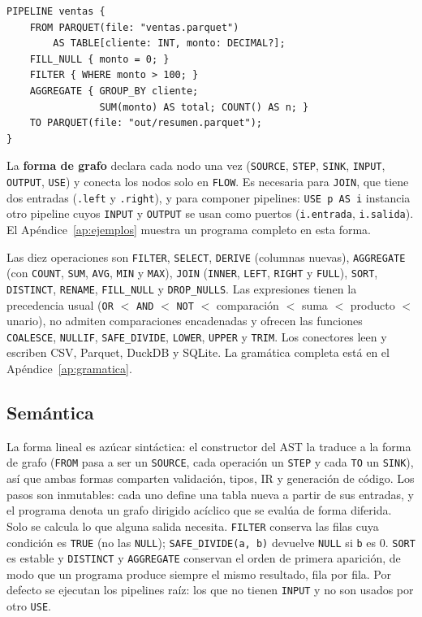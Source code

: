 \documentclass[sigplan,screen,nonacm]{acmart}
\begin{document}
\begin{lstlisting}[language=etl]
PIPELINE ventas {
    FROM PARQUET(file: "ventas.parquet")
        AS TABLE[cliente: INT, monto: DECIMAL?];
    FILL_NULL { monto = 0; }
    FILTER { WHERE monto > 100; }
    AGGREGATE { GROUP_BY cliente;
                SUM(monto) AS total; COUNT() AS n; }
    TO PARQUET(file: "out/resumen.parquet");
}
\end{lstlisting}

La \textbf{forma de grafo} declara cada nodo una vez (\texttt{SOURCE}, \texttt{STEP},
\texttt{SINK}, \texttt{INPUT}, \texttt{OUTPUT}, \texttt{USE}) y conecta los nodos solo en
\texttt{FLOW}. Es necesaria para \texttt{JOIN}, que tiene dos entradas (\texttt{.left} y
\texttt{.right}), y para componer pipelines: \texttt{USE p AS i} instancia otro pipeline cuyos
\texttt{INPUT} y \texttt{OUTPUT} se usan como puertos (\texttt{i.entrada}, \texttt{i.salida}).
El Apéndice~\ref{ap:ejemplos} muestra un programa completo en esta forma.

Las diez operaciones son \texttt{FILTER}, \texttt{SELECT}, \texttt{DERIVE} (columnas
nuevas), \texttt{AGGREGATE} (con \texttt{COUNT}, \texttt{SUM}, \texttt{AVG}, \texttt{MIN} y
\texttt{MAX}), \texttt{JOIN} (\texttt{INNER}, \texttt{LEFT}, \texttt{RIGHT} y \texttt{FULL}),
\texttt{SORT}, \texttt{DISTINCT}, \texttt{RENAME}, \texttt{FILL\_NULL} y \texttt{DROP\_NULLS}.
Las expresiones tienen la precedencia usual
(\texttt{OR} $<$ \texttt{AND} $<$ \texttt{NOT} $<$ comparación $<$ suma $<$ producto $<$
unario), no admiten comparaciones encadenadas y ofrecen las funciones \texttt{COALESCE},
\texttt{NULLIF}, \texttt{SAFE\_DIVIDE}, \texttt{LOWER}, \texttt{UPPER} y \texttt{TRIM}. Los
conectores leen y escriben CSV, Parquet, DuckDB y SQLite. La gramática completa está en el
Apéndice~\ref{ap:gramatica}.

\subsection{Semántica}
La forma lineal es azúcar sintáctica: el constructor del AST la traduce a la forma de grafo
(\texttt{FROM} pasa a ser un \texttt{SOURCE}, cada operación un \texttt{STEP} y cada
\texttt{TO} un \texttt{SINK}), así que ambas formas comparten validación, tipos, IR y
generación de código. Los pasos son inmutables: cada uno define una tabla nueva a partir de
sus entradas, y el programa denota un grafo dirigido acíclico que se evalúa de forma diferida.
Solo se calcula lo que alguna salida necesita. \texttt{FILTER} conserva las filas cuya
condición es \texttt{TRUE} (no las \texttt{NULL}); \texttt{SAFE\_DIVIDE(a, b)} devuelve
\texttt{NULL} si \texttt{b} es 0. \texttt{SORT} es estable y \texttt{DISTINCT} y
\texttt{AGGREGATE} conservan el orden de primera aparición, de modo que un programa produce
siempre el mismo resultado, fila por fila. Por defecto se ejecutan los pipelines raíz: los
que no tienen \texttt{INPUT} y no son usados por otro \texttt{USE}.
\end{document}
